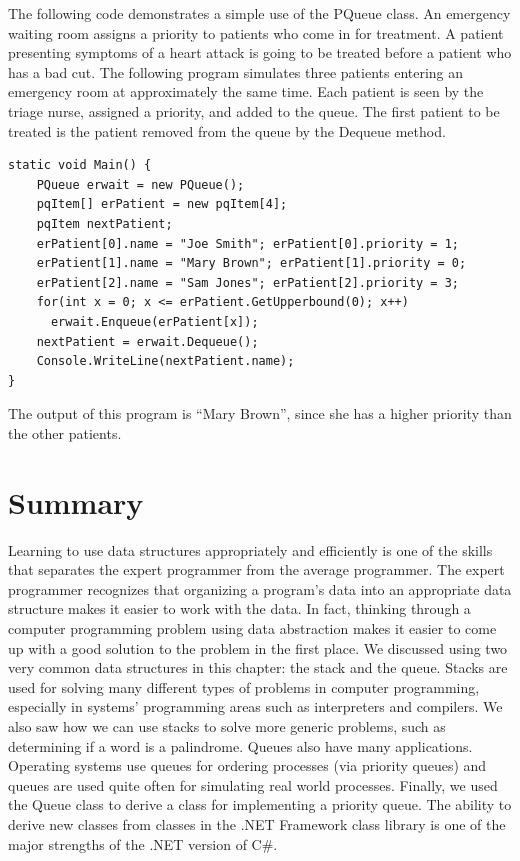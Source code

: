 \documentclass[12pt,a4paper,final,twoside,titlepage]{book}
\begin{document}
The following code demonstrates a simple use of the PQueue class. An emergency waiting room assigns a priority to patients who come in for treatment. A patient presenting symptoms of a heart attack is going to be treated before a patient who has a bad cut. The following program simulates three patients entering an emergency room at approximately the same time. Each patient is seen by the triage nurse, assigned a priority, and added to the queue. The first patient to be treated is the patient removed from the queue by the Dequeue method.
\begin{lstlisting}
static void Main() {
	PQueue erwait = new PQueue();
	pqItem[] erPatient = new pqItem[4];
	pqItem nextPatient;
	erPatient[0].name = "Joe Smith"; erPatient[0].priority = 1;
	erPatient[1].name = "Mary Brown"; erPatient[1].priority = 0;
	erPatient[2].name = "Sam Jones"; erPatient[2].priority = 3;
	for(int x = 0; x <= erPatient.GetUpperbound(0); x++)
      erwait.Enqueue(erPatient[x]);
    nextPatient = erwait.Dequeue();
    Console.WriteLine(nextPatient.name);
}
\end{lstlisting}
The output of this program is “Mary Brown”, since she has a higher priority than the other patients.
\section{Summary}
Learning to use data structures appropriately and efficiently is one of the skills that separates the expert programmer from the average programmer. The expert programmer recognizes that organizing a program’s data into an appropriate data structure makes it easier to work with the data. In fact, thinking through a computer programming problem using data abstraction makes it easier to come up with a good solution to the problem in the first place.
We discussed using two very common data structures in this chapter: the stack and the queue. Stacks are used for solving many different types of problems in computer programming, especially in systems’ programming areas such as interpreters and compilers. We also saw how we can use stacks to solve more generic problems, such as determining if a word is a palindrome.
Queues also have many applications. Operating systems use queues for ordering processes (via priority queues) and queues are used quite often for simulating real world processes. Finally, we used the Queue class to derive a class for implementing a priority queue. The ability to derive new classes from classes in the .NET Framework class library is one of the major strengths of the .NET version of C\#.
\end{document}
